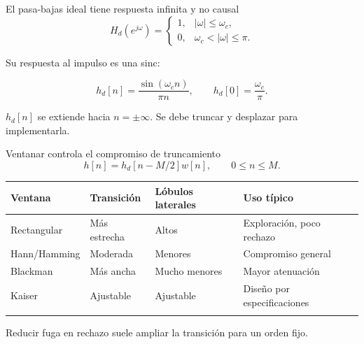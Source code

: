\documentclass[
  ignorenonframetext,
  aspectratio=169,
  spanish,
  professionalfonts]{beamer}
\newcounter{none} %
\begin{document}
\begin{frame}{El pasa-bajas ideal tiene respuesta infinita y no causal}
\protect{}\label{el-pasa-bajas-ideal-tiene-respuesta-infinita-y-no-causal}
\[
H_d(e^{j\omega})=
\begin{cases}
1,& |\omega|\le\omega_c,\\
0,& \omega_c<|\omega|\le\pi.
\end{cases}
\]

Su respuesta al impulso es una sinc:

\[
h_d[n]=\frac{\sin(\omega_c n)}{\pi n},
\qquad h_d[0]=\frac{\omega_c}{\pi}.
\]

\begin{tcolorbox}[enhanced jigsaw, arc=.35mm, bottomrule=.15mm, bottomtitle=1mm, breakable, colback=white, colbacktitle=quarto-callout-warning-color!10!white, colframe=quarto-callout-warning-color-frame, coltitle=black, left=2mm, leftrule=.75mm, opacityback=0, opacitybacktitle=0.6, rightrule=.15mm, title={Limitación}, titlerule=0mm, toprule=.15mm, toptitle=1mm]

\(h_d[n]\) se extiende hacia \(n=\pm\infty\). Se debe truncar y
desplazar para implementarla.

\end{tcolorbox}
\end{frame}

\begin{frame}{Ventanar controla el compromiso de truncamiento}
\protect{}\label{ventanar-controla-el-compromiso-de-truncamiento}
\[
h[n]=h_d[n-M/2]w[n],\qquad 0\le n\le M.
\]

{\def\LTcaptype{none} %
\begin{longtable}[]{@{}llll@{}}
\toprule\noalign{}
Ventana & Transición & Lóbulos laterales & Uso típico \\
\midrule\noalign{}
\endhead
Rectangular & Más estrecha & Altos & Exploración, poco rechazo \\
Hann/Hamming & Moderada & Menores & Compromiso general \\
Blackman & Más ancha & Mucho menores & Mayor atenuación \\
Kaiser & Ajustable & Ajustable & Diseño por especificaciones \\
\bottomrule\noalign{}
\end{longtable}
}

\begin{tcolorbox}[enhanced jigsaw, arc=.35mm, bottomrule=.15mm, bottomtitle=1mm, breakable, colback=white, colbacktitle=quarto-callout-note-color!10!white, colframe=quarto-callout-note-color-frame, coltitle=black, left=2mm, leftrule=.75mm, opacityback=0, opacitybacktitle=0.6, rightrule=.15mm, title={Principio}, titlerule=0mm, toprule=.15mm, toptitle=1mm]

Reducir fuga en rechazo suele ampliar la transición para un orden fijo.

\end{tcolorbox}
\end{frame}
\end{document}
